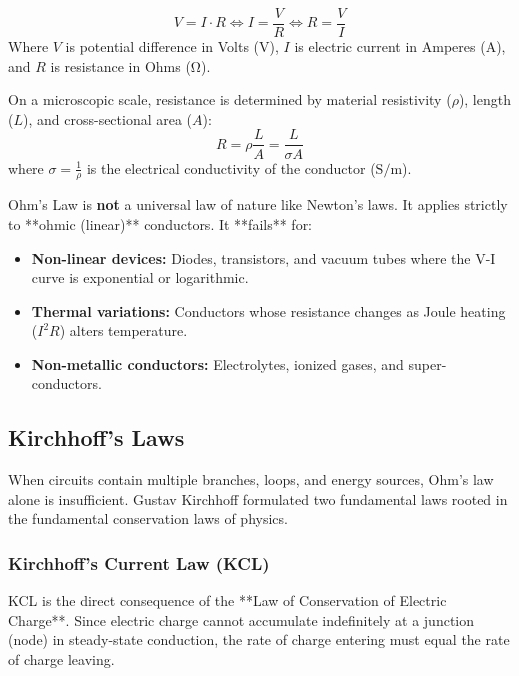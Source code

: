 \begin{keyequation}
\begin{equation}
    V = I \cdot R \iff I = \frac{V}{R} \iff R = \frac{V}{I}
\end{equation}
Where $V$ is potential difference in Volts ($\si{\volt}$), $I$ is electric current in Amperes ($\si{\ampere}$), and $R$ is resistance in Ohms ($\si{\ohm}$).
\end{keyequation}

\noindent On a microscopic scale, resistance is determined by material resistivity ($\rho$), length ($L$), and cross-sectional area ($A$):
\begin{equation}
    R = \rho \frac{L}{A} = \frac{L}{\sigma A}
\end{equation}
where $\sigma = \frac{1}{\rho}$ is the electrical conductivity of the conductor ($\si{\siemens\per\meter}$).

\begin{commonmistake}
Ohm's Law is \textbf{not} a universal law of nature like Newton's laws. It applies strictly to **ohmic (linear)** conductors. It **fails** for:
\begin{itemize}
    \item \textbf{Non-linear devices:} Diodes, transistors, and vacuum tubes where the V-I curve is exponential or logarithmic.
    \item \textbf{Thermal variations:} Conductors whose resistance changes as Joule heating ($I^2R$) alters temperature.
    \item \textbf{Non-metallic conductors:} Electrolytes, ionized gases, and super-conductors.
\end{itemize}
\end{commonmistake}

\subsection{Kirchhoff's Laws}
When circuits contain multiple branches, loops, and energy sources, Ohm's law alone is insufficient. Gustav Kirchhoff formulated two fundamental laws rooted in the fundamental conservation laws of physics.

\subsubsection{Kirchhoff's Current Law (KCL)}
KCL is the direct consequence of the **Law of Conservation of Electric Charge**. Since electric charge cannot accumulate indefinitely at a junction (node) in steady-state conduction, the rate of charge entering must equal the rate of charge leaving.

